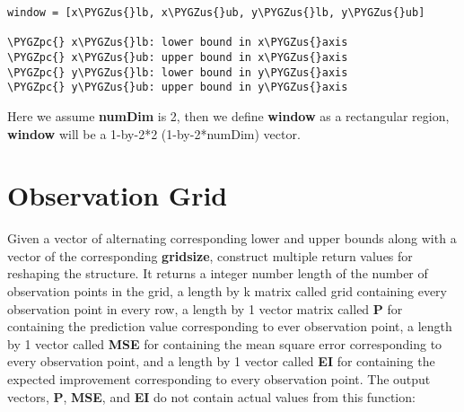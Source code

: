 \documentclass[letterpaper,10pt,english]{sphinxmanual}
\def\PYGZus{\char`\_}
\def\PYGZpc{\char`\%}
\begin{document}
\begin{Verbatim}[commandchars=\\\{\}]
window = [x\PYGZus{}lb, x\PYGZus{}ub, y\PYGZus{}lb, y\PYGZus{}ub]

\PYGZpc{} x\PYGZus{}lb: lower bound in x\PYGZus{}axis
\PYGZpc{} x\PYGZus{}ub: upper bound in x\PYGZus{}axis
\PYGZpc{} y\PYGZus{}lb: lower bound in y\PYGZus{}axis
\PYGZpc{} y\PYGZus{}ub: upper bound in y\PYGZus{}axis
\end{Verbatim}

Here we assume \textbf{numDim} is 2, then we define \textbf{window} as a rectangular region, \textbf{window} will be a 1-by-2*2 (1-by-2*numDim) vector.


\section{Observation Grid}
\label{initial:observation-grid}
Given a vector of alternating corresponding lower and upper bounds along with a vector of the corresponding \textbf{gridsize}, construct multiple return values for reshaping the structure. It returns a integer number length of the number of observation points in the grid, a length by k matrix called grid containing every observation point in every row, a length by 1 vector matrix called \textbf{P} for containing the prediction value corresponding to ever observation point, a length by 1 vector called \textbf{MSE} for containing the mean square error corresponding to every observation point, and a length by 1 vector called \textbf{EI} for containing the expected improvement corresponding to every observation point. The output vectors, \textbf{P}, \textbf{MSE}, and \textbf{EI} do not contain actual values from this function:
\end{document}
